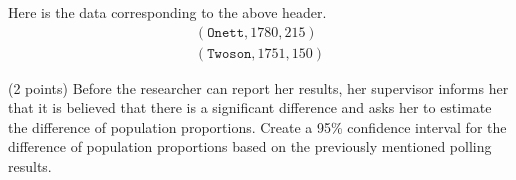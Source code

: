 \documentclass{ccg-topic}
\begin{document}
\begin{enumerate}
Here is the data corresponding to the above header.
\begin{align*}
    (\mathtt{Onett}, 1780, 215)\\
    (\mathtt{Twoson}, 1751, 150)
\end{align*}

(2 points) Before the researcher can report her results, her supervisor informs her that it is believed that there is a significant difference and asks her to estimate the difference of population proportions. Create a 95\% confidence interval for the difference of population proportions based on the previously mentioned polling results.

\vfill
\end{enumerate}
\end{document}
